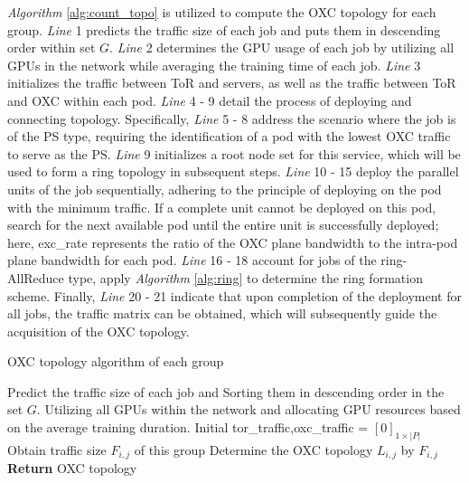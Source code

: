 \documentclass[conference]{IEEEtran}
\begin{document}
\emph{Algorithm} \ref{alg:count_topo} is utilized to compute the OXC topology for each group. \emph{Line} 1 predicts the traffic size of each job and puts them in descending order within set $G$. \emph{Line} 2 determines the GPU usage of each job by utilizing all GPUs in the network while averaging the training time of each job. \emph{Line} 3 initializes the traffic between ToR and servers, as well as the traffic between ToR and OXC within each pod. \emph{Line} 4 - 9 detail the process of deploying and connecting topology. Specifically, \emph{Line} 5 - 8 address the scenario where the job is of the PS type, requiring the identification of a pod with the lowest OXC traffic to serve as the PS. \emph{Line} 9 initializes a root node set for this service, which will be used to form a ring topology in subsequent steps. \emph{Line} 10 - 15 deploy the parallel units of the job sequentially, adhering to the principle of deploying on the pod with the minimum traffic. If a complete unit cannot be deployed on this pod, search for the next available pod until the entire unit is successfully deployed; here, exc\_rate represents the ratio of the OXC plane bandwidth to the intra-pod plane bandwidth for each pod. \emph{Line} 16 - 18 account for jobs of the ring-AllReduce type, apply \emph{Algorithm} \ref{alg:ring} to determine the ring formation scheme. Finally, \emph{Line} 20 - 21 indicate that upon completion of the deployment for all jobs, the traffic matrix can be obtained, which will subsequently guide the acquisition of the OXC topology.

\begin{algorithm}
	\caption{OXC topology algorithm of each group}
	\label{alg:count_topo}
	\LinesNumbered
	Predict the traffic size of each job and Sorting them in descending order in the set $G$.\;
	Utilizing all GPUs within the network and allocating GPU resources based on the average training duration.\;
	Initial tor\_traffic,oxc\_traffic = $[0]_{1\times|P|}$\;
	Obtain traffic size $F_{i,j}$ of this group\;
	Determine the OXC topology $L_{i,j}$ by $F_{i,j}$\;
	\textbf{Return} OXC topology\;
\end{algorithm}
\end{document}
